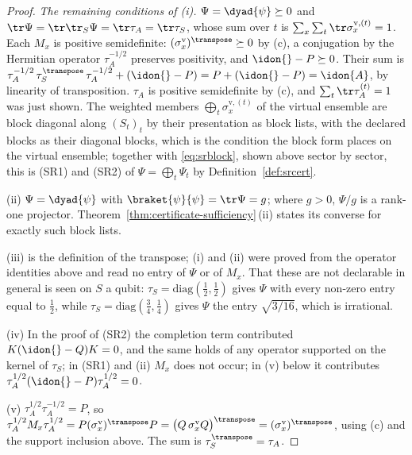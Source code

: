 \begin{proof}
\emph{The remaining conditions of (i).} $\Psi=\dyad{\psi}\succeq0$ and
$\tr\Psi=\tr\tr_S\Psi=\tr\tau_A=\tr\tau_S$, whose sum over $t$ is
$\sum_x\sum_t\tr\sigma^{\mathrm v,(t)}_x=1$. Each $M_x$ is positive
semidefinite: $(\sigma^{\mathrm v}_x)^{\transpose}\succeq0$ by (c), a
conjugation by the Hermitian operator $\tau_A^{-1/2}$ preserves positivity,
and $\idon{}-P\succeq0$. Their sum is
$\tau_A^{-1/2}\,\tau_S^{\transpose}\,\tau_A^{-1/2}+(\idon{}-P)
=P+(\idon{}-P)=\idon{A}$, by linearity of transposition. $\tau_A$ is
positive semidefinite by (c), and $\sum_t\tr\tau^{(t)}_A=1$ was just shown.
The weighted members $\bigoplus_t\sigma^{\mathrm v,(t)}_x$ of the virtual
ensemble are block diagonal along $(S_t)_t$ by their presentation as block
lists, with the declared blocks as their diagonal blocks, which is the
condition the block form places on the virtual ensemble; together with
\eqref{eq:srblock}, shown above sector by sector, this is (SR1) and (SR2) of
$\Psi=\bigoplus_t\Psi_t$ by Definition~\ref{def:srcert}.

(ii) $\Psi=\dyad{\psi}$ with $\braket{\psi}{\psi}=\tr\Psi=g$; where $g>0$,
$\Psi/g$ is a rank-one projector. Theorem~\ref{thm:certificate-sufficiency}\,(ii) states its
converse for exactly such block lists.

(iii) is the definition of the transpose; (i) and (ii) were proved from the
operator identities above and read no entry of $\Psi$ or of $M_x$. That
these are not declarable in general is seen on $S$ a qubit:
$\tau_S=\mathrm{diag}(\tfrac12,\tfrac12)$ gives $\Psi$ with every non-zero
entry equal to $\tfrac12$, while $\tau_S=\mathrm{diag}(\tfrac34,\tfrac14)$
gives $\Psi$ the entry $\sqrt{3/16}$, which is irrational.

(iv) In the proof of (SR2) the completion term contributed
$K(\idon{}-Q)K=0$, and the same holds of any operator supported on the
kernel of $\tau_S$; in (SR1) and (ii) $M_x$ does not occur; in (v) below it
contributes $\tau_A^{1/2}(\idon{}-P)\tau_A^{1/2}=0$.

(v) $\tau_A^{1/2}\tau_A^{-1/2}=P$, so
$\tau_A^{1/2}M_x\tau_A^{1/2}=P(\sigma^{\mathrm v}_x)^{\transpose}P
=\big(Q\,\sigma^{\mathrm v}_xQ\big)^{\transpose}
=(\sigma^{\mathrm v}_x)^{\transpose}$, using (c) and the support inclusion
above. The sum is $\tau_S^{\transpose}=\tau_A$.
\end{proof}

